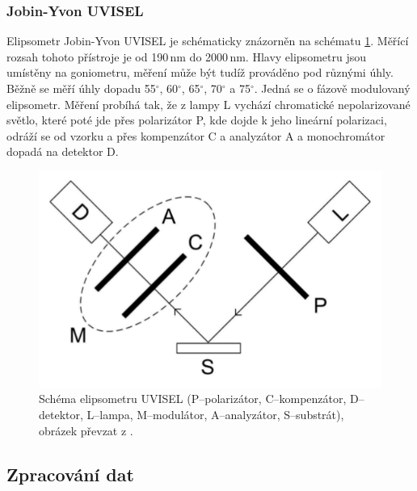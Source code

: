 \documentclass[12pt,oneside,final]{fithesis2}
\begin{document}
\subsubsection{Jobin-Yvon UVISEL}
Elipsometr Jobin-Yvon UVISEL je schématicky znázorněn na schématu \ref{fig:elipsometrimg}.  Měřící rozsah tohoto přístroje je od 190\,nm do 2000\,nm. Hlavy elipsometru jsou umístěny na goniometru, měření může být tudíž prováděno pod různými úhly. Běžně se měří úhly dopadu 55$^\circ$, 60$^\circ$, 65$^\circ$, 70$^\circ$ a 75$^\circ$. Jedná se o fázově modulovaný elipsometr. Měření probíhá tak, že z lampy L vychází chromatické nepolarizované světlo, které poté jde přes polarizátor P, kde dojde k jeho lineární polarizaci, odráží se od vzorku a přes kompenzátor C a analyzátor A a monochromátor dopadá na detektor D.


\begin{figure}
  \centering
  \includegraphics[width=120mm]{schema-elipsometru.png}
  \caption{Schéma elipsometru UVISEL (P--polarizátor, C--kompenzátor, D--detektor, L--lampa, M--modulátor, A--analyzátor, S--substrát), obrázek převzat z \cite{fialova2009}.}
  \label{fig:elipsometrimg}
\end{figure}

\subsection{Zpracování dat}
\end{document}
